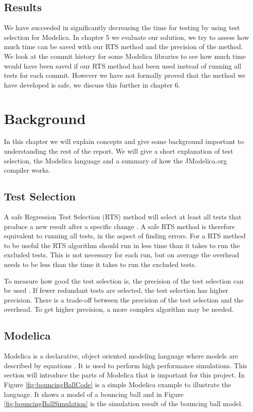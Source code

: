 \documentclass{cslthse-msc}
\begin{document}
\section{Results}
We have succeeded in significantly decreasing the time for testing by using test selection for Modelica. In chapter 5 we evaluate our solution, we try to assess how much time can be saved with our RTS method and the precision of the method. We look at the commit history for some Modelica libraries to see how much time would have been saved if our RTS method had been used instead of running all tests for each commit. However we have not formally proved that the method we have developed is safe, we discuss this further in chapter 6.

\chapter[Background]{Background}
In this chapter we will explain concepts and give some background important to understanding the rest of the report. We will give a short explanation of test selection, the Modelica language and a summary of how the JModelica.org compiler works.

\section{Test Selection}
A safe Regression Test Selection (RTS) method will select at least all tests that produce a new result after a specific change \cite{DBLP:conf/pppj/OqvistHM16}. A safe RTS method is therefore equivalent to running all tests, in the aspect of finding errors. For a RTS method to be useful the RTS algorithm should run in less time than it takes to run the excluded tests. This is not necessary for each run, but on average the overhead needs to be less than the time it takes to run the excluded tests.

To measure how good the test selection is, the precision of the test selection can be used \cite{DBLP:conf/sigsoft/LegunsenHSLZM16}. If fewer redundant tests are selected, the test selection has higher precision. There is a trade-off between the precision of the test selection and the overhead. To get higher precision, a more complex algorithm may be needed.

\section{Modelica}
Modelica is a declarative, object oriented modeling language where models are described by equations \cite{modelicamodelica}. It is used to perform high performance simulations. This section will introduce the parts of Modelica that is important for this project. In Figure \ref{fig:bouncingBallCode} is a simple Modelica example to illustrate the language. It shows a model of a bouncing ball and in Figure \ref{fig:bouncingBallSimulation} is the simulation result of the bouncing ball model.
\end{document}
